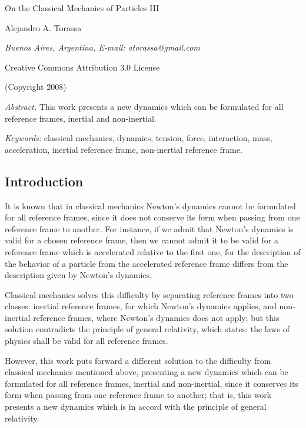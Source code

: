 \documentclass[11pt]{article}
\begin{document}
\begin{center}

{\Large On the Classical Mechanics of Particles III}

\bigskip \bigskip

\small

Alejandro A. Torassa

\footnotesize

\bigskip

{\em Buenos Aires, Argentina, E-mail: atorassa@gmail.com}

\bigskip

Creative Commons Attribution 3.0 License

\bigskip

(Copyright 2008)

\end{center}

\bigskip

\footnotesize

{\em Abstract.\/} This work presents a new dynamics which can be formulated for all reference frames, inertial and non-inertial.

\bigskip

{\em Keywords:\/} classical mechanics, dynamics, tension, force, interaction, mass, acceleration, inertial reference frame, non-inertial reference frame.

\normalsize

{\centering\subsection*{Introduction}}

\par It is known that in classical mechanics Newton's dynamics cannot be formulated for all reference frames, since it does not conserve its form when passing from one reference frame to another. For instance, if we admit that Newton's dynamics is valid for a chosen reference frame, then we cannot admit it to be valid for a reference frame which is accelerated relative to the first one, for the description of the behavior of a particle from the accelerated reference frame differs from the description given by Newton's dynamics.
\medskip
\par Classical mechanics solves this difficulty by separating reference frames into two classes: inertial reference frames, for which Newton's dynamics applies, and non-inertial reference frames, where Newton's dynamics does not apply; but this solution contradicts the principle of general relativity, which states: the laws of physics shall be valid for all reference frames.
\medskip
\par However, this work puts forward a different solution to the difficulty from classical mechanics mentioned above, presenting a new dynamics which can be formulated for all reference frames, inertial and non-inertial, since it conserves its form when passing from one reference frame to another; that is, this work presents a new dynamics which is in accord with the principle of general relativity.
\end{document}
